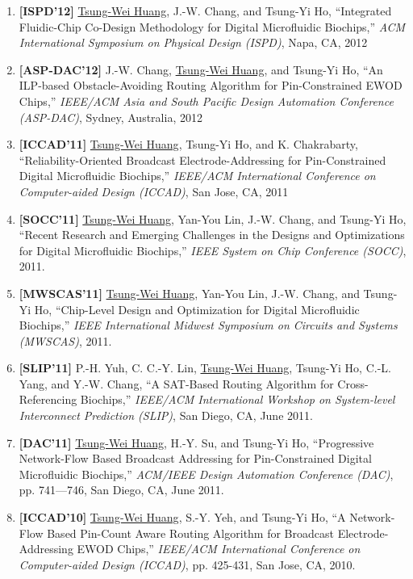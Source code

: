 \documentclass[A4,11pt]{article}
\begin{document}
\begin{enumerate}
    \item \textbf{[ISPD'12]} \underline{Tsung-Wei Huang}, J.-W. Chang, and Tsung-Yi Ho, ``Integrated Fluidic-Chip Co-Design Methodology for Digital Microfluidic Biochips,'' \textit{ACM International Symposium on Physical Design (ISPD)}, Napa, CA, 2012

    \item \textbf{[ASP-DAC'12]} J.-W. Chang, \underline{Tsung-Wei Huang}, and Tsung-Yi Ho, ``An ILP-based Obstacle-Avoiding Routing Algorithm for Pin-Constrained EWOD Chips,'' \textit{IEEE/ACM Asia and South Pacific Design Automation Conference (ASP-DAC)}, Sydney, Australia, 2012

    \item \textbf{[ICCAD'11]} \underline{Tsung-Wei Huang}, Tsung-Yi Ho, and K. Chakrabarty, ``Reliability-Oriented Broadcast Electrode-Addressing for Pin-Constrained Digital Microfluidic Biochips,'' \textit{IEEE/ACM International Conference on Computer-aided Design (ICCAD)}, San Jose, CA, 2011

    \item \textbf{[SOCC'11]} \underline{Tsung-Wei Huang}, Yan-You Lin, J.-W. Chang, and Tsung-Yi Ho, ``Recent Research and Emerging Challenges in the Designs and Optimizations for Digital Microfluidic Biochips,'' \textit{IEEE System on Chip Conference (SOCC)}, 2011. 
    \item \textbf{[MWSCAS'11]} \underline{Tsung-Wei Huang}, Yan-You Lin, J.-W. Chang, and Tsung-Yi Ho, ``Chip-Level Design and Optimization for Digital Microfluidic Biochips,'' \textit{IEEE International Midwest Symposium on Circuits and Systems (MWSCAS)}, 2011. 
    
    \item \textbf{[SLIP'11]} P.-H. Yuh, C. C.-Y. Lin, \underline{Tsung-Wei Huang}, Tsung-Yi Ho, C.-L. Yang, and Y.-W. Chang, ``A SAT-Based Routing Algorithm for Cross-Referencing Biochips,'' \textit{IEEE/ACM International Workshop on System-level Interconnect Prediction (SLIP)}, San Diego, CA, June 2011.

    \item \textbf{[DAC'11]} \underline{Tsung-Wei Huang}, H.-Y. Su, and Tsung-Yi Ho, ``Progressive Network-Flow Based Broadcast Addressing for Pin-Constrained Digital Microfluidic Biochips,'' \textit{ACM/IEEE Design Automation Conference (DAC)}, pp. 741—746, San Diego, CA, June 2011. 

    \item \textbf{[ICCAD'10]} \underline{Tsung-Wei Huang}, S.-Y. Yeh, and Tsung-Yi Ho, ``A Network-Flow Based Pin-Count Aware Routing Algorithm for Broadcast Electrode-Addressing EWOD Chips,'' \textit{IEEE/ACM International Conference on Computer-aided Design (ICCAD)}, pp. 425-431, San Jose, CA, 2010. 


\end{enumerate}
\end{document}

